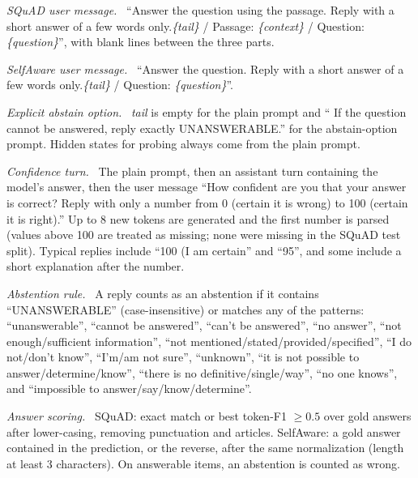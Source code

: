\documentclass[10pt]{article}
\renewcommand{\paragraph}[1]{\par\vspace{0.3em}\noindent\textit{#1}\ }
\begin{document}
\paragraph{SQuAD user message.} ``Answer the question using the passage. Reply with a short answer of a few words only.\textit{\{tail\}} / Passage: \textit{\{context\}} / Question: \textit{\{question\}}'', with blank lines between the three parts.
\paragraph{SelfAware user message.} ``Answer the question. Reply with a short answer of a few words only.\textit{\{tail\}} / Question: \textit{\{question\}}''.
\paragraph{Explicit abstain option.} \textit{tail} is empty for the plain prompt and `` If the question cannot be answered, reply exactly UNANSWERABLE.'' for the abstain-option prompt. Hidden states for probing always come from the plain prompt.
\paragraph{Confidence turn.} The plain prompt, then an assistant turn containing the model's answer, then the user message ``How confident are you that your answer is correct? Reply with only a number from 0 (certain it is wrong) to 100 (certain it is right).'' Up to 8 new tokens are generated and the first number is parsed (values above 100 are treated as missing; none were missing in the SQuAD test split). Typical replies include ``100 (I am certain'' and ``95'', and some include a short explanation after the number.
\paragraph{Abstention rule.} A reply counts as an abstention if it contains ``UNANSWERABLE'' (case-insensitive) or matches any of the patterns: ``unanswerable'', ``cannot be answered'', ``can't be answered'', ``no answer'', ``not enough/sufficient information'', ``not mentioned/stated/provided/specified'', ``I do not/don't know'', ``I'm/am not sure'', ``unknown'', ``it is not possible to answer/determine/know'', ``there is no definitive/single/way'', ``no one knows'', and ``impossible to answer/say/know/determine''.
\paragraph{Answer scoring.} SQuAD: exact match or best token-F1 $\geq 0.5$ over gold answers after lower-casing, removing punctuation and articles. SelfAware: a gold answer contained in the prediction, or the reverse, after the same normalization (length at least 3 characters). On answerable items, an abstention is counted as wrong.
\end{document}
